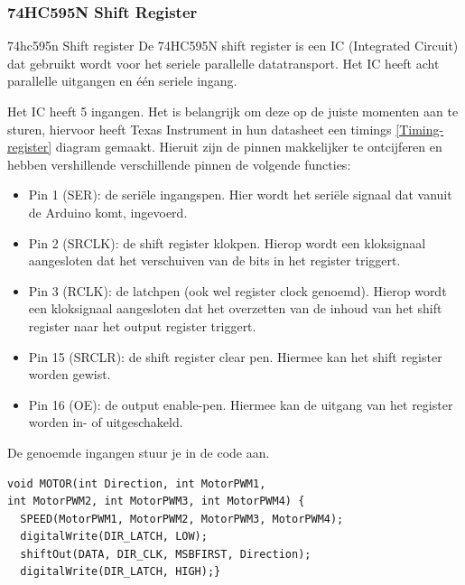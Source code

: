 \subsubsection{74HC595N Shift Register}
74hc595n Shift register
De 74HC595N shift register\cite{shiftregister} is een \gls{IC} (Integrated Circuit) dat gebruikt wordt voor het seriele parallelle datatransport. Het IC heeft acht parallelle uitgangen en één seriele ingang. 

Het \gls{IC} heeft 5 ingangen. Het is belangrijk om deze op de juiste momenten aan te sturen, hiervoor heeft Texas Instrument in hun datasheet\cite{shiftregister} een timings \eqref{Timing-register} diagram gemaakt. Hieruit zijn de pinnen makkelijker te ontcijferen en hebben vershillende verschillende pinnen de volgende functies:
\begin{itemize}
    \item Pin 1 (SER): de seriële ingangspen. Hier wordt het seriële signaal dat vanuit de Arduino komt, ingevoerd.
    \item Pin 2 (SRCLK): de shift register klokpen. Hierop wordt een kloksignaal aangesloten dat het verschuiven van de bits in het register triggert.
    \item Pin 3 (RCLK): de latchpen (ook wel register clock genoemd). Hierop wordt een kloksignaal aangesloten dat het overzetten van de inhoud van het shift register naar het output register triggert.
    \item Pin 15 (SRCLR): de shift register clear pen. Hiermee kan het shift register worden gewist.
    \item Pin 16 (OE): de output enable-pen. Hiermee kan de uitgang van het register worden in- of uitgeschakeld.
\end{itemize}
De genoemde ingangen stuur je in de code aan.
\begin{lstlisting}
void MOTOR(int Direction, int MotorPWM1,
int MotorPWM2, int MotorPWM3, int MotorPWM4) {
  SPEED(MotorPWM1, MotorPWM2, MotorPWM3, MotorPWM4);
  digitalWrite(DIR_LATCH, LOW);
  shiftOut(DATA, DIR_CLK, MSBFIRST, Direction);
  digitalWrite(DIR_LATCH, HIGH);}
\end{lstlisting}

